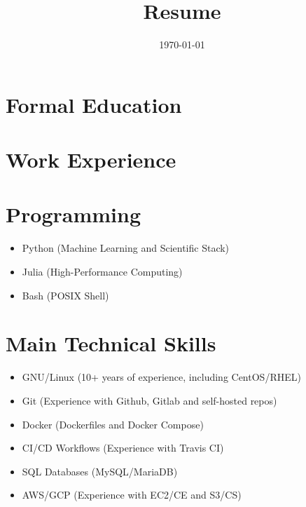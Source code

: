 \documentclass[a4paper, 11pt]{moderncv}
\date{\today}
\title{Resume}
\begin{document}
\maketitle

\section{Formal Education}
\label{sec:org16b2a28}


\section{Work Experience}
\label{sec:org2ae027a}

\section{Programming}
\label{sec:org89c732a}
\begin{itemize}
\item Python (Machine Learning and Scientific Stack)
\item Julia (High-Performance Computing)
\item Bash (POSIX Shell)
\end{itemize}

\section{Main Technical Skills}
\label{sec:orgf847696}
\begin{itemize}
\item GNU/Linux (10+ years of experience, including CentOS/RHEL)
\item Git (Experience with Github, Gitlab and self-hosted repos)
\item Docker (Dockerfiles and Docker Compose)
\item CI/CD Workflows (Experience with Travis CI)
\item SQL Databases (MySQL/MariaDB)
\item AWS/GCP (Experience with EC2/CE and S3/CS)
\end{itemize}
\end{document}
